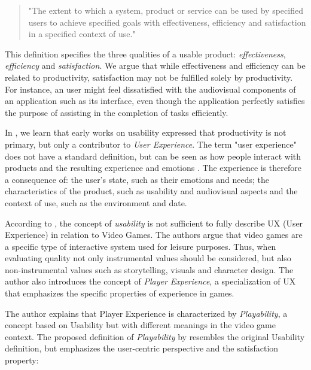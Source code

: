 \begin{quotation}
"The extent to which a system, product or service can be used by specified users to achieve specified goals with effectiveness, efficiency and satisfaction in a specified context of use."
\end{quotation}

This definition specifies the three qualities of a usable product: \emph{effectiveness}, \emph{efficiency} and \emph{satisfaction}. We argue that while effectiveness and efficiency can be related to productivity,  satisfaction may not be fulfilled solely by productivity. For instance, an user might feel dissatisfied with the audiovisual components of an application such as its interface, even though the application perfectly satisfies the purpose of assisting in the completion of tasks efficiently.

In \citep{ARTICLE_UserExperienceAResearchAgenda}, we learn that early works on usability expressed that productivity is not primary, but only a contributor to \emph{User Experience}. The term "user experience" does not have a standard definition, but can be seen as how people interact with products and the resulting experience and emotions \cite{ARTICLE_UnderstandingExperience}. The experience is therefore a consequence of: the user's state, such as their emotions and needs; the characteristics of the product, such as usability and audiovisual aspects and the context of use, such as the environment and date.

According to \cite{ARTICLE_FromUsabilityToPlayability}, the concept of \emph{usability} is not sufficient to fully describe UX (User Experience) in relation to Video Games. The authors argue that video games are a specific type of interactive system used for leisure purposes. Thus, when evaluating quality not only instrumental values should be considered, but also non-instrumental values such as storytelling, visuals and character design. The author also introduces the concept of \emph{Player Experience}, a specialization of UX that emphasizes the specific properties of experience in games.

The author explains that Player Experience is characterized by \emph{Playability}, a concept based on Usability but with different meanings in the video game context. The proposed definition of \emph{Playability} by \cite{ARTICLE_FromUsabilityToPlayability} resembles the original Usability definition, but emphasizes the user-centric perspective and the satisfaction property:

